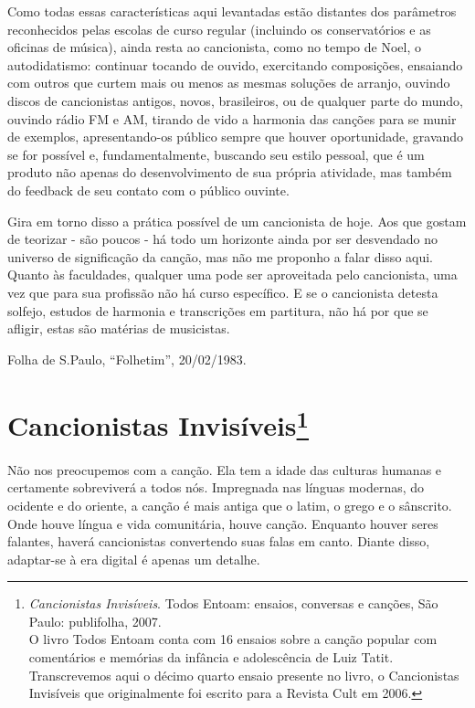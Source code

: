 Como todas essas características aqui levantadas estão distantes dos
parâmetros reconhecidos pelas escolas de curso regular (incluindo os
conservatórios e as oficinas de música), ainda resta ao cancionista,
como no tempo de Noel, o autodidatismo: continuar tocando de ouvido,
exercitando composições, ensaiando com outros que curtem mais ou menos
as mesmas soluções de arranjo, ouvindo discos de cancionistas antigos,
novos, brasileiros, ou de qualquer parte do mundo, ouvindo rádio FM e
AM, tirando de vido a harmonia das canções para se munir de exemplos,
apresentando-os público sempre que houver oportunidade, gravando se for
possível e, fundamentalmente, buscando seu estilo pessoal, que é um
produto não apenas do desenvolvimento de sua própria atividade, mas
também do feedback de seu contato com o público ouvinte.

Gira em torno disso a prática possível de um cancionista de hoje. Aos
que gostam de teorizar - são poucos - há todo um horizonte ainda por ser
desvendado no universo de significação da canção, mas não me proponho a
falar disso aqui. Quanto às faculdades, qualquer uma pode ser
aproveitada pelo cancionista, uma vez que para sua profissão não há
curso específico. E se o cancionista detesta solfejo, estudos de
harmonia e transcrições em partitura, não há por que se afligir, estas
são matérias de musicistas.

Folha de S.Paulo, ``Folhetim'', 20/02/1983.


\chapter{Cancionistas Invisíveis\footnote{\emph{Cancionistas Invisíveis}. Todos Entoam: ensaios, conversas e
canções, São Paulo: publifolha, 2007.\\
O livro Todos Entoam conta com 16 ensaios sobre a canção
popular com comentários e memórias da infância e adolescência de Luiz
Tatit. Transcrevemos aqui o décimo quarto ensaio presente no livro, o
Cancionistas Invisíveis que originalmente foi escrito para a Revista
Cult em 2006.}}



Não nos preocupemos com a canção. Ela tem a idade das culturas humanas e
certamente sobreviverá a todos nós. Impregnada nas línguas modernas, do
ocidente e do oriente, a canção é mais antiga que o latim, o grego e o
sânscrito. Onde houve língua e vida comunitária, houve canção. Enquanto
houver seres falantes, haverá cancionistas convertendo suas falas em
canto. Diante disso, adaptar-se à era digital é apenas um detalhe.

